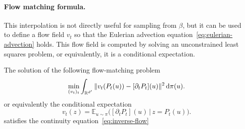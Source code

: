 \paragraph{Flow matching formula.}

This interpolation is not directly useful for sampling from $\beta$, but it can be used to define a flow field $v_t$ so that the Eulerian advection equation~\eqref{eq:eulerian-advection} holds.
%
This flow field is computed by solving an unconstrained least squares problem, or equivalently, it is a conditional expectation.

\begin{prop}
	The solution of the following flow-matching problem
	\begin{equation}
    	\min_{(v_t)_t} \int_{\mathbb{R}^{d'}} \|v_t(P_t(u)) - [\partial_t P_t](u)\|^2 \, \mathrm{d}\pi(u). \label{eq:flow-matching}
	\end{equation}
	or equivalently the conditional expectation 
	\begin{equation}\label{eq:flow-match-conditional}
		v_t(z) = \mathbb{E}_{u \sim \pi} \big( [\partial_t  P_t](u) \, \big| \, z = P_t(u) \big).
	\end{equation}
	satisfies the continuity equation~\eqref{eq:inverse-flow}
\end{prop}


